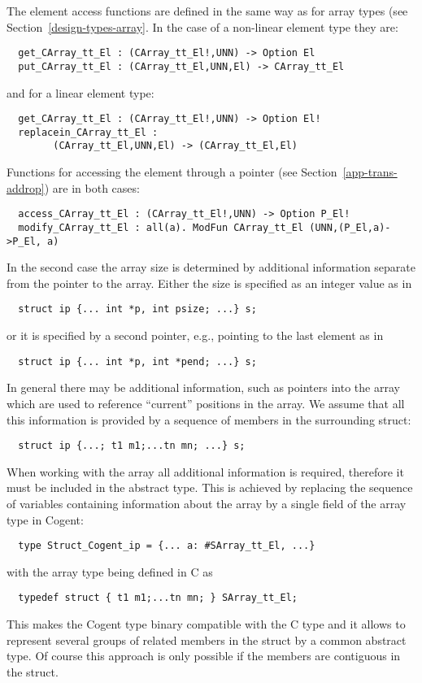 The element access functions are defined in the same way as for array types (see Section~\ref{design-types-array}. 
In the case of a non-linear element type they are:
\begin{verbatim}
  get_CArray_tt_El : (CArray_tt_El!,UNN) -> Option El
  put_CArray_tt_El : (CArray_tt_El,UNN,El) -> CArray_tt_El
\end{verbatim}
and for a linear element type:
\begin{verbatim}
  get_CArray_tt_El : (CArray_tt_El!,UNN) -> Option El!
  replacein_CArray_tt_El : 
        (CArray_tt_El,UNN,El) -> (CArray_tt_El,El)
\end{verbatim}
Functions for accessing the element through a pointer (see Section~\ref{app-trans-addrop}) are in both cases:
\begin{verbatim}
  access_CArray_tt_El : (CArray_tt_El!,UNN) -> Option P_El!
  modify_CArray_tt_El : all(a). ModFun CArray_tt_El (UNN,(P_El,a)->P_El, a)
\end{verbatim}

In the second case the array size is determined by additional information separate from the pointer to the array.
Either the size is specified as an integer value as in 
\begin{verbatim}
  struct ip {... int *p, int psize; ...} s;
\end{verbatim}
or it is specified by a second pointer, e.g., pointing to the last element as in
\begin{verbatim}
  struct ip {... int *p, int *pend; ...} s;
\end{verbatim}
In general there may be additional information, such as pointers into the array which are used to reference
``current'' positions in the array. We assume that all this information is provided by a sequence of members
in the surrounding struct:
\begin{verbatim}
  struct ip {...; t1 m1;...tn mn; ...} s;
\end{verbatim}
When working with the array all additional information is required, therefore it must be included in the abstract
type. This is achieved by replacing the sequence of variables containing information about the array by a single
field of the array type in Cogent:
\begin{verbatim}
  type Struct_Cogent_ip = {... a: #SArray_tt_El, ...}
\end{verbatim}
with the array type being defined in C as
\begin{verbatim}
  typedef struct { t1 m1;...tn mn; } SArray_tt_El;
\end{verbatim}
This makes the Cogent type  binary compatible with the C type  and it allows
to represent several groups of related members in the struct by a common abstract type. Of course this approach is 
only possible if the members are contiguous in the struct.

